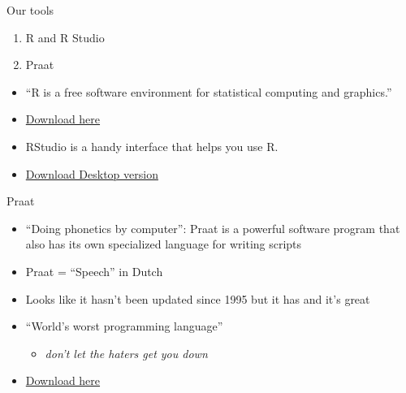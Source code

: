 \documentclass[
  ignorenonframetext,
]{beamer}
\providecommand{\tightlist}{%
  \setlength{\itemsep}{0pt}\setlength{\parskip}{0pt}}
\begin{document}
\begin{frame}{Our tools}
\protect\hypertarget{our-tools}{}

\begin{enumerate}
\tightlist
\item
  R and R Studio
\item
  Praat
\end{enumerate}

\end{frame}

\begin{frame}{}
\protect\hypertarget{section}{}

\begin{itemize}
\tightlist
\item
  ``R is a free software environment for statistical computing and
  graphics.''
\item
  \href{https://www.r-project.org/}{Download here}
\end{itemize}

\end{frame}

\begin{frame}{}
\protect\hypertarget{section-1}{}

\begin{itemize}
\tightlist
\item
  RStudio is a handy interface that helps you use R.
\item
  \href{https://rstudio.com/products/rstudio/download/}{Download Desktop
  version}
\end{itemize}

\end{frame}

\begin{frame}{ Praat}
\protect\hypertarget{praat}{}

\begin{itemize}
\tightlist
\item
  ``Doing phonetics by computer'': Praat is a powerful software program
  that also has its own specialized language for writing scripts
\item
  Praat = ``Speech'' in Dutch
\item
  Looks like it hasn't been updated since 1995 but it has and it's great
\item
  ``World's worst programming language''

  \begin{itemize}
  \tightlist
  \item
    \emph{don't let the haters get you down}
  \end{itemize}
\item
  \href{http://www.fon.hum.uva.nl/praat/}{Download here}
\end{itemize}

\end{frame}
\end{document}
